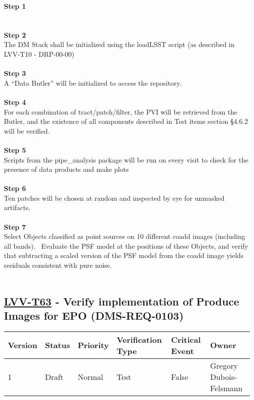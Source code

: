 \textbf{Step 1}\\
~\\
~\\
\textbf{Step 2}\\
The DM Stack shall be initialized using the loadLSST script (as
described in LVV-T10 - DRP-00-00)\\
~\\
\textbf{Step 3}\\
A ``Data Butler'' will be initialized to access the repository.\\
~\\
\textbf{Step 4}\\
For each combination of tract/patch/filter, the PVI will be retrieved
from the Butler, and the existence of all components described in Test
items section §4.6.2 will be verified.\\
~\\
\textbf{Step 5}\\
Scripts from the pipe\_analysis package will be run on every visit to
check for the presence of data products and make plots\\
~\\
\textbf{Step 6}\\
Ten patches will be chosen at random and inspected by eye for unmasked
artifacts.\\
~\\
\textbf{Step 7}\\
Select Objects classified as point sources on 10 different coadd images
(including all bands). ~Evaluate the PSF model at the positions of these
Objects, and verify that subtracting a scaled version of the PSF model
from the coadd image yields residuals consistent with pure noise.\\
~\\

\hypertarget{lvv-t63---verify-implementation-of-produce-images-for-epo-dms-req-0103}{%
\subsection{\texorpdfstring{\href{https://jira.lsstcorp.org/secure/Tests.jspa\#/testCase/LVV-T63}{LVV-T63}
- Verify implementation of Produce Images for EPO
(DMS-REQ-0103)}{LVV-T63 - Verify implementation of Produce Images for EPO (DMS-REQ-0103)}}\label{lvv-t63---verify-implementation-of-produce-images-for-epo-dms-req-0103}}

\begin{longtable}[]{@{}llllll@{}}
\toprule
Version & Status & Priority & Verification Type & Critical Event &
Owner\tabularnewline
\midrule
\endhead
1 & Draft & Normal & Test & False & Gregory
Dubois-Felsmann\tabularnewline
\bottomrule
\end{longtable}


